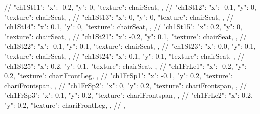 {{{    //   "ch1St11":{ "x": -0.2,  "y": 0, "texture": chairSeat, },
    //   "ch1St12":{ "x": -0.1,  "y": 0, "texture": chairSeat, },
    //   "ch1St13":{ "x": 0,     "y": 0, "texture": chairSeat, },
    //   "ch1St14":{ "x": 0.1,   "y": 0, "texture": chairSeat, },
    //   "ch1St15":{ "x": 0.2,   "y": 0, "texture": chairSeat, },
    //   "ch1St21":{ "x": -0.2,  "y": 0.1, "texture": chairSeat, },
    //   "ch1St22":{ "x": -0.1,  "y": 0.1, "texture": chairSeat, },
    //   "ch1St23":{ "x": 0.0,   "y": 0.1, "texture": chairSeat, },
    //   "ch1St24":{ "x": 0.1,   "y": 0.1, "texture": chairSeat, },
    //   "ch1St25":{ "x": 0.2,   "y": 0.1, "texture": chairSeat, },
    //   "ch1FrLe1":{ "x": -0.2, "y": 0.2, "texture": chariFrontLeg, },
    //   "ch1FrSp1":{ "x": -0.1, "y": 0.2, "texture": chariFrontspan, },
    //   "ch1FrSp2":{ "x": 0,    "y": 0.2, "texture": chariFrontspan, },
    //   "ch1FrSp3":{ "x": 0.1,  "y": 0.2, "texture": chariFrontspan, },
    //   "ch1FrLe2":{ "x": 0.2,  "y": 0.2, "texture": chariFrontLeg, },
    // }
  },  

}
